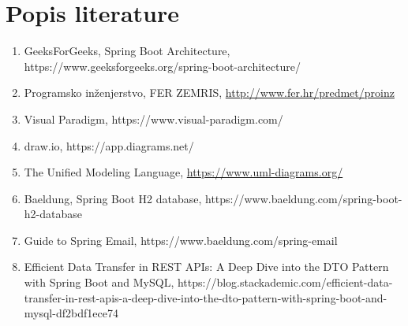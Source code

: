 \chapter*{Popis literature}
		
		\begin{enumerate}
			
			\item GeeksForGeeks, Spring Boot Architecture, https://www.geeksforgeeks.org/spring-boot-architecture/
			
			\item  Programsko inženjerstvo, FER ZEMRIS, \url{http://www.fer.hr/predmet/proinz}
			
			\item Visual Paradigm, https://www.visual-paradigm.com/
			
			\item draw.io, https://app.diagrams.net/
			
			\item  The Unified Modeling Language, \url{https://www.uml-diagrams.org/}
			
			\item Baeldung, Spring Boot H2 database, https://www.baeldung.com/spring-boot-h2-database
			
			\item Guide to Spring Email, https://www.baeldung.com/spring-email
			
			\item Efficient Data Transfer in REST APIs: A Deep Dive into the DTO Pattern with Spring Boot and MySQL, https://blog.stackademic.com/efficient-data-transfer-in-rest-apis-a-deep-dive-into-the-dto-pattern-with-spring-boot-and-mysql-df2bdf1ece74
			
			
		\end{enumerate}
		
		 